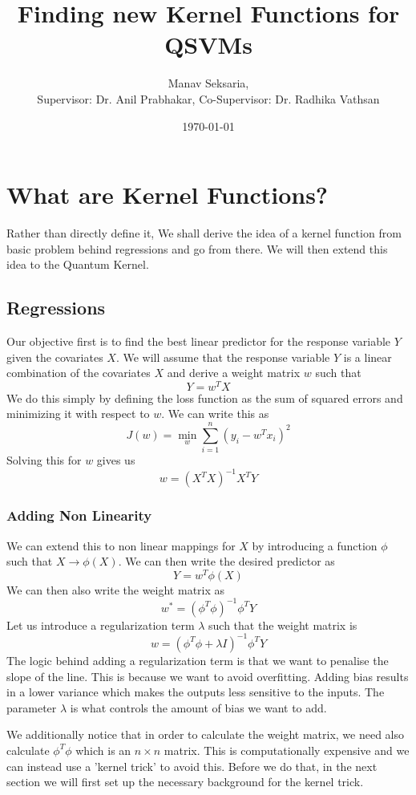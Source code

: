 \documentclass[hidelinks]{book}
\title{Finding new Kernel Functions for QSVMs}
\author{Manav Seksaria,\\ Supervisor: Dr. Anil Prabhakar, Co-Supervisor: Dr. Radhika Vathsan}
\date{\today}
\numberwithin{equation}{section}
\begin{document}
\maketitle

\section{What are Kernel Functions?}
Rather than directly define it, We shall derive the idea of a kernel function
from basic problem behind regressions and go from there. We will then extend this
idea to the Quantum Kernel.

\subsection{Regressions}
  Our objective first is to find the best linear predictor for the response
  variable $Y$ given the covariates $X$. We will assume that the response
  variable $Y$ is a linear combination of the covariates $X$ and derive a
  weight matrix $w$ such that
  $$ Y = w^T X $$ We do this simply by defining the loss function as the sum of
  squared errors and minimizing it with respect to $w$. We can write this as
  $$ J(w) = \min_w \sum_{i=1}^n (y_i - w^T x_i)^2 $$ Solving this for $w$
  gives us
  $$ w = (X^T X)^{-1} X^T Y $$

  \subsubsection{Adding Non Linearity}
  We can extend this to non linear mappings for $X$ by introducing a function $\phi$ such that $X \rightarrow \phi(X)$. We can then write the desired predictor as
  $$ Y = w^T \phi(X) $$ We can then also write the weight matrix as
  $$ w^* = (\phi^T \phi)^{-1} \phi^T Y $$ Let us introduce a regularization term $\lambda$ such that the weight matrix is
  $$ w = (\phi^T \phi + \lambda I)^{-1} \phi^T Y $$ The logic behind adding a regularization term is that we want to penalise the slope of the line. This is because we want to avoid overfitting. Adding bias results in a lower variance which makes the outputs less sensitive to the inputs. The parameter $\lambda$ is what controls the amount of bias we want to add.

  We additionally notice that in order to calculate the weight matrix, we need also calculate $\phi^T \phi$ which is an $n \times n$ matrix. This is computationally expensive and we can instead use a 'kernel trick' to avoid this. Before we do that, in the next section we will first set up the necessary background for the kernel trick.
\end{document}
